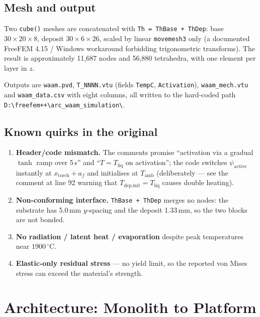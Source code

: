 \documentclass[10pt,a4paper]{article}
\newcommand{\code}[1]{\texttt{#1}}
\begin{document}
\subsection{Mesh and output}

Two \code{cube()} meshes are concatenated with
\code{Th = ThBase + ThDep}: base $30\times20\times8$, deposit
$30\times6\times26$, scaled by linear \code{movemesh3} only (a documented
FreeFEM 4.15 / Windows workaround forbidding trigonometric transforms). The
result is approximately 11{,}687 nodes and 56{,}880 tetrahedra, with one
element per layer in $z$.

Outputs are \code{waam.pvd}, \code{T\_NNNN.vtu} (fields \code{TempC},
\code{Activation}), \code{waam\_mech.vtu} and \code{waam\_data.csv} with eight
columns, all written to the hard-coded path
\code{D:\textbackslash freefem++\textbackslash arc\_waam\_simulation\textbackslash}.

\subsection{Known quirks in the original}
\begin{enumerate}[leftmargin=1.6em,itemsep=0.15em]
    \item \textbf{Header/code mismatch.} The comments promise ``activation via
    a gradual $\tanh$ ramp over 5\,s'' and ``$T = T_{\text{liq}}$ on
    activation''; the code switches $\psi_{\text{active}}$ instantly at
    $x_{\text{torch}} + a_f$ and initialises at $T_{\text{amb}}$
    (deliberately --- see the comment at line 92 warning that
    $T_{\text{dep,init}} = T_{\text{liq}}$ causes double heating).
    \item \textbf{Non-conforming interface.} \code{ThBase + ThDep} merges no
    nodes: the substrate has 5.0\,mm $y$-spacing and the deposit 1.33\,mm, so
    the two blocks are not bonded.
    \item \textbf{No radiation / latent heat / evaporation} despite peak
    temperatures near $1900\,^\circ$C.
    \item \textbf{Elastic-only residual stress} --- no yield limit, so the
    reported von Mises stress can exceed the material's strength.
\end{enumerate}

\section{Architecture: Monolith to Platform}
\end{document}

